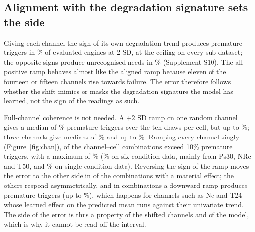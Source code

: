 \begin{table}[!t]
\caption{Stress test in within-condition SD units, heteroscedastic head, $L=20$, one-sided 95\% bound. PICP: central 90\% coverage; one-sided: share of engines with true RUL above the lower bound; $f_{\mathrm{oob}}$: \% of normalised sensor inputs outside $[-1,1]$. Rates are \% of evaluated engines with engine-bootstrap 95\% intervals (2000 resamples, conditional on the five models). An interval of $[0.0, 0.0]$ means that no engine showed the event; see Section~\ref{sec:framework} for the exact upper bound. All mechanisms, lead times and shift sizes: supplementary CSV files.}
\label{tab:sd}
\centering\scriptsize

\end{table}

\subsection{Alignment with the degradation signature sets the side}\label{sec:align}
Giving each channel the sign of its own degradation trend produces premature triggers in \RVPremAligned\% of evaluated engines at 2 SD, at the ceiling on every sub-dataset; the opposite signs produce unrecognised needs in \RVLateAnti\% (Supplement S10). The all-positive ramp behaves almost like the aligned ramp because eleven of the fourteen or fifteen channels rise towards failure. The error therefore follows whether the shift mimics or masks the degradation signature the model has learned, not the sign of the readings as such.

Full-channel coherence is not needed. A $+2$ SD ramp on one random channel gives a median of \RVKOneMed\% premature triggers over the ten draws per cell, but up to \RVKOneMax\%; three channels give medians of \RVKThreeMed\% and up to \RVKThreeMax\%. Ramping every channel singly (Figure~\ref{fig:chan}), \RVChanGtTen{} of the \RVChanN{} channel--cell combinations exceed 10\% premature triggers, with a maximum of \RVChanMax\% (\RVChanMaxSixCond\% on six-condition data, mainly from Ps30, NRc and T50, and \RVChanMaxSingleCond\% on single-condition data). Reversing the sign of the ramp moves the error to the other side in \RVChanFlip{} of the \RVChanMaterial{} combinations with a material effect; the others respond asymmetrically, and in \RVChanNegPremN{} combinations a downward ramp produces premature triggers (up to \RVChanNegPremMax\%), which happens for channels such as Nc and T24 whose learned effect on the predicted mean runs against their univariate trend. The side of the error is thus a property of the shifted channels and of the model, which is why it cannot be read off the interval.


